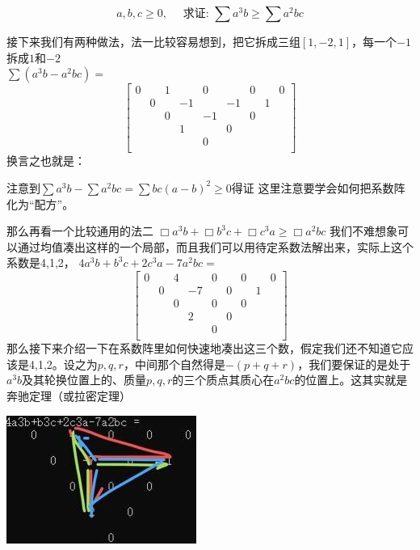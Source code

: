 \documentclass[UTF8]{ctexart}
\begin{document}
$$ a, b, c \geq 0, \quad \text { 求证: } \sum a^{3} b \geq \sum a^{2} b c
$$

接下来我们有两种做法，法一比较容易想到，把它拆成三组$ [1,-2,1] $，每一个$ -1 $拆成$ 1 $和$ -2 $\\
$ \displaystyle \sum (a^{3} b-a^{2} b c)= $
\renewcommand*{\arraystretch}{1.732}\[\left[\begin{matrix}
	0& &1& &0& &0& &0\\
	&0& &-1& &-1& &1&\\
	& &0& &-1& &0& &\\
	& & &1& &0& & &\\
	& & & &0& & & &\\
\end{matrix}\right]\]
换言之也就是：\\
\begin{center}
	注意到$ \displaystyle \sum a^{3} b-\displaystyle \sum a^{2} b c=\displaystyle \sum b c(a-b)^{2} \geq 0 $得证
	这里注意要学会如何把系数阵化为“配方”。
\end{center}
那么再看一个比较通用的法二
$ \Box a^{3} b+\Box b^{3} c+\Box c^{3} a \geq \Box a^{2} b c $
我们不难想象可以通过均值凑出这样的一个局部，而且我们可以用待定系数法解出来，实际上这个系数是4,1,2，
$ 4a^{3}b+b^{3}c+2c^{3}a-7a^{2}bc= $\\
\renewcommand*{\arraystretch}{1.732}\[\left[\begin{matrix}
	0& &4& &0& &0& &0\\
	& 0& &-7& &0& &1&\\
	& &0& &0& &0& &\\
	& & &2& &0& & &\\
	& & & &0& & & &\\
\end{matrix}\right]\]
那么接下来介绍一下在系数阵里如何快速地凑出这三个数，假定我们还不知道它应该是4,1,2。设之为$ p,q,r $，中间那个自然得是$ -(p+q+r) $，我们要保证的是处于$ a^{3}b $及其轮换位置上的、质量$ p,q,r $的三个质点其质心在$ a^{2}bc $的位置上。这其实就是奔驰定理（或拉密定理）

\begin{center}
	\includegraphics[width=0.4\linewidth]{13}
\end{center}
\end{document}
